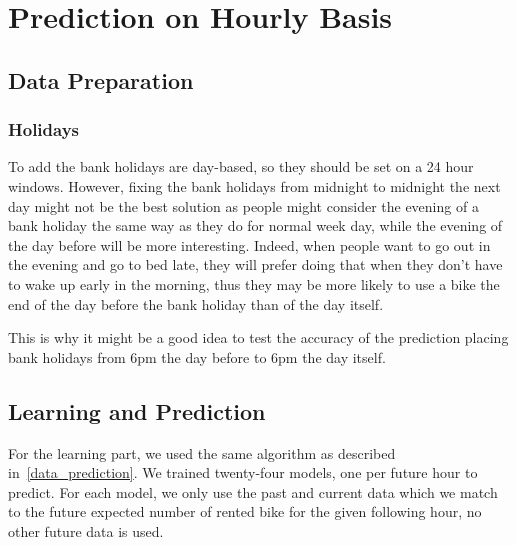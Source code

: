 
\section{Prediction on Hourly Basis}

\subsection{Data Preparation}


\subsubsection{Holidays}

To add the bank holidays are day-based, so they should be set on a 24 hour windows.
However, fixing the bank holidays from midnight to midnight the next day might not
be the best solution as people might consider the evening of a bank holiday the same
way as they do for normal week day, while the evening of the day before will be more
interesting. Indeed, when people want to go out in the evening and go to bed late,
they will prefer doing that when they don't have to wake up early in the morning,
thus they may be more likely to use a bike the end of the day before the bank
holiday than of the day itself.

This is why it might be a good idea to test the accuracy of the prediction
placing bank holidays from 6pm the day before to 6pm the day itself.


\subsection{Learning and Prediction}

For the learning part, we used the same algorithm as described in~\ref{data_prediction}.
We trained twenty-four models, one per future hour to predict.
For each model, we only use the past and current data which we match to
the future expected number of rented bike for the given following hour,
no other future data is used.

